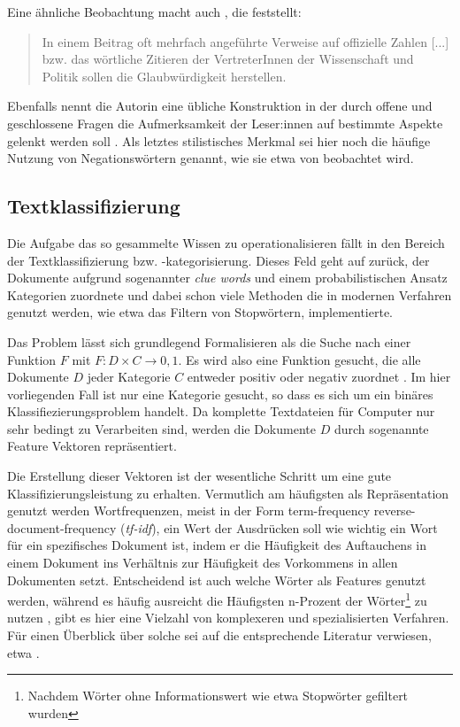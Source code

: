 Eine ähnliche Beobachtung macht auch \textcite{filatkina_2018}, die feststellt:

\begin{quotation}
    In einem Beitrag oft mehrfach angeführte Verweise auf offizielle Zahlen [...] bzw. das wörtliche Zitieren der VertreterInnen der Wissenschaft und Politik sollen die Glaubwürdigkeit herstellen. \parencite[][208]{filatkina_2018}
\end{quotation}

Ebenfalls nennt die Autorin eine übliche Konstruktion in der durch offene und geschlossene Fragen die Aufmerksamkeit der Leser:innen auf bestimmte Aspekte gelenkt werden soll \parencite[][205]{filatkina_2018}.
Als letztes stilistisches Merkmal sei hier noch die häufige Nutzung von Negationswörtern genannt, wie sie etwa von \textcite[149]{stumpf_2019} beobachtet wird.


\subsection{Textklassifizierung}

Die Aufgabe das so gesammelte Wissen zu operationalisieren fällt in den Bereich der Textklassifizierung bzw. -kategorisierung.
Dieses Feld geht auf \textcite{maron_1961} zurück, der Dokumente aufgrund sogenannter \textit{clue words} und einem probabilistischen Ansatz Kategorien zuordnete und dabei schon viele Methoden die in modernen Verfahren genutzt werden, wie etwa das Filtern von Stopwörtern, implementierte.

Das Problem lässt sich grundlegend Formalisieren als die Suche nach einer Funktion $F$ mit $F : D \times C \rightarrow {0, 1}$.
Es wird also eine Funktion gesucht, die alle Dokumente $D$ jeder Kategorie $C$ entweder positiv oder negativ zuordnet \parencite[vgl.][66f]{feldman_sanger_2006}.
Im hier vorliegenden Fall ist nur eine Kategorie gesucht, so dass es sich um ein binäres Klassifiezierungsproblem handelt.
Da komplette Textdateien für Computer nur sehr bedingt zu Verarbeiten sind, werden die Dokumente $D$ durch sogenannte Feature Vektoren repräsentiert.

Die Erstellung dieser Vektoren ist der wesentliche Schritt um eine gute Klassifizierungsleistung zu erhalten.
Vermutlich am häufigsten als Repräsentation genutzt werden Wortfrequenzen, meist in der Form term-frequency reverse-document-frequency (\textit{tf-idf}), ein Wert der Ausdrücken soll wie wichtig ein Wort für ein spezifisches Dokument ist, indem er die Häufigkeit des Auftauchens in einem Dokument ins Verhältnis zur Häufigkeit des Vorkommens in allen Dokumenten setzt.
Entscheidend ist auch welche Wörter als Features genutzt werden, während es häufig ausreicht die Häufigsten n-Prozent der Wörter\footnote{Nachdem Wörter ohne Informationswert wie etwa Stopwörter  gefiltert wurden}  zu nutzen \parencite[][68]{feldman_sanger_2006}, gibt es hier eine Vielzahl von komplexeren und spezialisierten Verfahren.
Für einen Überblick über solche sei auf die entsprechende Literatur verwiesen, etwa \textcite{yang_1997}.

